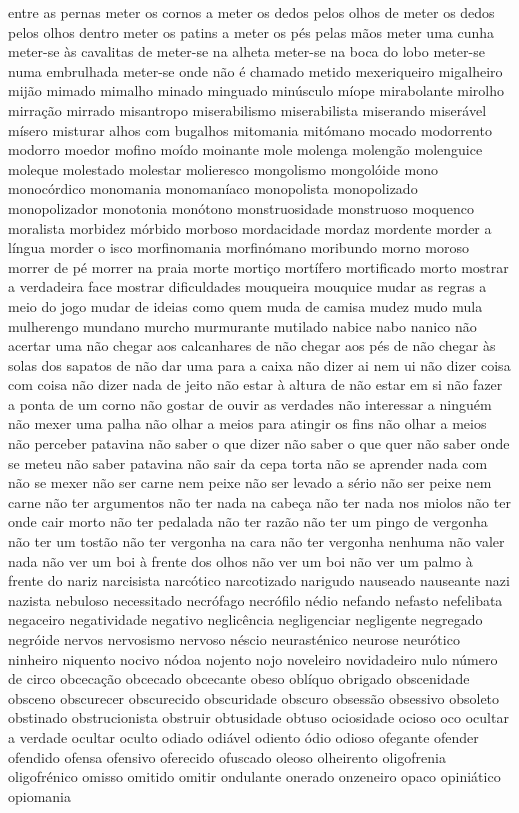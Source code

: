 \begin{appendices}
entre as pernas meter os cornos a meter os dedos pelos olhos de meter os dedos pelos olhos dentro meter os patins a meter os p\'{e}s pelas m\~aos meter uma cunha meter-se \`{a}s cavalitas de meter-se na alheta meter-se na boca do lobo meter-se numa embrulhada meter-se onde n\~ao \'{e} chamado metido mexeriqueiro migalheiro mij\~ao mimado mimalho minado minguado min\'{u}sculo m\'{i}ope mirabolante mirolho mirra\c{c}\~ao mirrado misantropo miserabilismo miserabilista miserando miser\'{a}vel m\'{i}sero misturar alhos com bugalhos mitomania mit\'{o}mano mocado modorrento modorro moedor mofino mo\'{i}do moinante mole molenga moleng\~ao molenguice moleque molestado molestar molieresco mongolismo mongol\'{o}ide mono monoc\'{o}rdico monomania monoman\'{i}aco monopolista monopolizado monopolizador monotonia mon\'{o}tono monstruosidade monstruoso moquenco moralista morbidez m\'{o}rbido morboso mordacidade mordaz mordente morder a l\'{i}ngua morder o isco morfinomania morfin\'{o}mano moribundo morno moroso morrer de p\'{e} morrer na praia morte morti\c{c}o mort\'{i}fero mortificado morto mostrar a verdadeira face mostrar dificuldades mouqueira mouquice mudar as regras a meio do jogo mudar de ideias como quem muda de camisa mudez mudo mula mulherengo mundano murcho murmurante mutilado nabice nabo nanico n\~ao acertar uma n\~ao chegar aos calcanhares de n\~ao chegar aos p\'{e}s de n\~ao chegar \`{a}s solas dos sapatos de n\~ao dar uma para a caixa n\~ao dizer ai nem ui n\~ao dizer coisa com coisa n\~ao dizer nada de jeito n\~ao estar \`{a} altura de n\~ao estar em si n\~ao fazer a ponta de um corno n\~ao gostar de ouvir as verdades n\~ao interessar a ningu\'{e}m n\~ao mexer uma palha n\~ao olhar a meios para atingir os fins n\~ao olhar a meios n\~ao perceber patavina n\~ao saber o que dizer n\~ao saber o que quer n\~ao saber onde se meteu n\~ao saber patavina n\~ao sair da cepa torta n\~ao se aprender nada com n\~ao se mexer n\~ao ser carne nem peixe n\~ao ser levado a s\'{e}rio n\~ao ser peixe nem carne n\~ao ter argumentos n\~ao ter nada na cabe\c{c}a n\~ao ter nada nos miolos n\~ao ter onde cair morto n\~ao ter pedalada n\~ao ter raz\~ao n\~ao ter um pingo de vergonha n\~ao ter um tost\~ao n\~ao ter vergonha na cara n\~ao ter vergonha nenhuma n\~ao valer nada n\~ao ver um boi \`{a} frente dos olhos n\~ao ver um boi n\~ao ver um palmo \`{a} frente do nariz narcisista narc\'{o}tico narcotizado narigudo nauseado nauseante nazi nazista nebuloso necessitado necr\'{o}fago necr\'{o}filo n\'{e}dio nefando nefasto nefelibata negaceiro negatividade negativo neglic\^{e}ncia negligenciar negligente negregado negr\'{o}ide nervos nervosismo nervoso n\'{e}scio neurast\'{e}nico neurose neur\'{o}tico ninheiro niquento nocivo n\'{o}doa nojento nojo noveleiro novidadeiro nulo n\'{u}mero de circo obceca\c{c}\~ao obcecado obcecante obeso obl\'{i}quo obrigado obscenidade obsceno obscurecer obscurecido obscuridade obscuro obsess\~ao obsessivo obsoleto obstinado obstrucionista obstruir obtusidade obtuso ociosidade ocioso oco ocultar a verdade ocultar oculto odiado odi\'{a}vel odiento \'{o}dio odioso ofegante ofender ofendido ofensa ofensivo oferecido ofuscado oleoso olheirento oligofrenia oligofr\'{e}nico omisso omitido omitir ondulante onerado onzeneiro opaco opini\'{a}tico opiomania 
\end{appendices}
